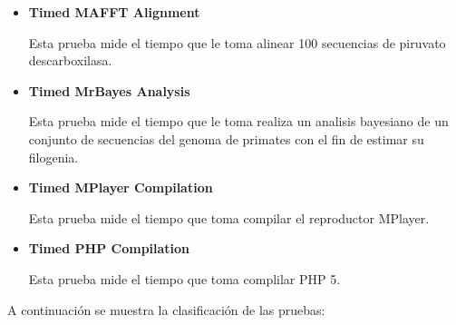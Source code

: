 \documentclass[12pt, letterpaper]{article}
\begin{document}
\begin{itemize}
                                \item \textbf{Timed MAFFT Alignment}\vspace{.05cm}
                                
                                        Esta prueba mide el tiempo que le 
                                        toma alinear 100 secuencias de piruvato
                                        descarboxilasa.

                                \item \textbf{Timed MrBayes Analysis}\vspace{.05cm}
                                
                                        Esta prueba mide el tiempo que le 
                                        toma realiza un analisis bayesiano 
                                        de un conjunto de secuencias del 
                                        genoma de primates con el fin de 
                                        estimar su filogenia.

                                \item \textbf{Timed MPlayer Compilation}\vspace{.05cm}
                                
                                        Esta prueba mide el tiempo que 
                                        toma compilar el reproductor MPlayer.
                                
                                \item \textbf{Timed PHP Compilation}\vspace{.05cm}
                                
                                        Esta prueba mide el tiempo que 
                                        toma complilar PHP 5.

                        \end{itemize}

                        A continuación se muestra la clasificación de las pruebas:
\end{document}
